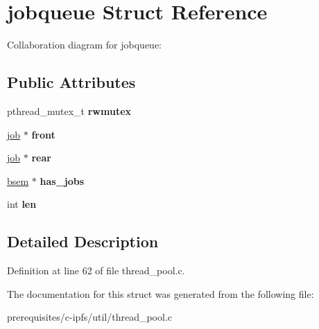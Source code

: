 \hypertarget{structjobqueue}{}\section{jobqueue Struct Reference}
\label{structjobqueue}


Collaboration diagram for jobqueue\+:
\subsection*{Public Attributes}
\begin{DoxyCompactItemize}
\item 
\mbox{\label{structjobqueue_a86c0492954cff4ffda78b29fe422ff54}} 
pthread\+\_\+mutex\+\_\+t {\bfseries rwmutex}
\item 
\mbox{\label{structjobqueue_ad12dc2b09955aa4c5e1c44a986c7f158}} 
\mbox{\hyperlink{structjob}{job}} $\ast$ {\bfseries front}
\item 
\mbox{\label{structjobqueue_ac8cbe49e98d2456fdf9b1221ffc9827d}} 
\mbox{\hyperlink{structjob}{job}} $\ast$ {\bfseries rear}
\item 
\mbox{\label{structjobqueue_aad359c907783dbac3a93b3618d53c97b}} 
\mbox{\hyperlink{structbsem}{bsem}} $\ast$ {\bfseries has\+\_\+jobs}
\item 
\mbox{\label{structjobqueue_a4c31e18dc40ec5ce79f675ba60b24316}} 
int {\bfseries len}
\end{DoxyCompactItemize}


\subsection{Detailed Description}


Definition at line 62 of file thread\+\_\+pool.\+c.



The documentation for this struct was generated from the following file\+:\begin{DoxyCompactItemize}
\item 
prerequisites/c-\/ipfs/util/thread\+\_\+pool.\+c\end{DoxyCompactItemize}
